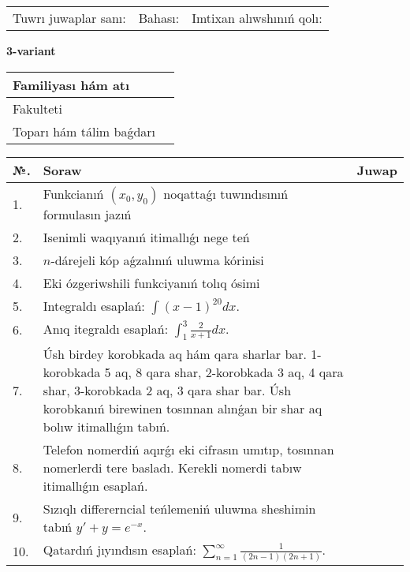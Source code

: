 \documentclass{article}
\begin{document}
\vspace{1cm}

\begin{tabular}{ c c c }
Tuwrı juwaplar sanı: \underline{\hspace{2cm}} & Bahası: \underline{\hspace{2cm}} & Imtixan alıwshınıń qolı: \underline{\hspace{2cm}} \\
\end{tabular}

\newpage

\begin{center}\textbf{3-variant}\end{center}

\bgroup
\def\arraystretch{1.5}
\begin{tabular}{ |m{6cm}|m{10cm}| }
  \hline
  Familiyası hám atı & \\
  \hline
  Fakulteti &\\
  \hline
  Toparı hám tálim baǵdarı & \\
  \hline
\end{tabular}
\egroup

\vspace{0.5cm}

\bgroup
\def\arraystretch{2}
\begin{tabular}{ |l|m{8cm}|m{7cm}| }
  \hline
  №. & Soraw & Juwap \\
  \hline
  1. & Funkcianıń $(x_{0}, y_{0})$ noqattaǵı tuwındısınıń formulasın jazıń &  \\
  \hline
  2. & Isenimli waqıyanıń itimallıǵı nege teń &  \\
  \hline
  3. & $n$-dárejeli kóp aǵzalınıń uluwma kórinisi &  \\
  \hline
  4. & Eki ózgeriwshili funkciyanıń tolıq ósimi &  \\
  \hline
  5. & Integraldı esaplań: $\displaystyle\int (x - 1)^{20}dx$. &  \\
  \hline
  6. & Anıq itegraldı esaplań: $\displaystyle\int_{1}^{3}{\frac{2}{x + 1}dx}$. &  \\
  \hline
  7. & Úsh birdey korobkada aq hám qara sharlar bar. 1-korobkada 5 aq, 8 qara shar, 2-korobkada 3 aq, 4 qara shar, 3-korobkada 2 aq, 3 qara shar bar. Úsh korobkanıń birewinen tosınnan alınǵan bir shar aq bolıw itimallıǵın tabıń. &  \\
  \hline
  8. & Telefon nomerdiń aqırǵı eki cifrasın umıtıp, tosınnan nomerlerdi tere basladı. Kerekli nomerdi tabıw itimallıǵın esaplań. &  \\
  \hline
  9. & Sızıqlı differerncial teńlemeniń uluwma sheshimin tabıń $y' + y =e^{-x}$. &  \\
  \hline
  10. & Qatardıń jıyındısın esaplań: $\displaystyle\sum_{n = 1}^{\infty}\frac{1}{(2n - 1)(2n + 1)}$. &  \\
  \hline
\end{tabular}
\egroup
\end{document}
